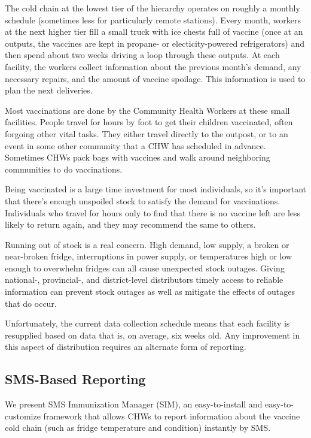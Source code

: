 \documentclass{acm_proc_article-sp}
\begin{document}
The cold chain at the lowest tier of the hierarchy operates on roughly a monthly schedule (sometimes less for particularly remote stations). Every month, workers at the next higher tier fill a small truck with ice chests full of vaccine (once at an outputs, the vaccines are kept in propane- or electicity-powered refrigerators) and then spend about two weeks driving a loop through these outputs. At each facility, the workers collect information about the previous month's demand, any necessary repairs, and the amount of vaccine spoilage. This information is used to plan the next deliveries. 

Most vaccinations are done by the Community Health Workers at these small facilities. People travel for hours by foot to get their children vaccinated, often forgoing other vital tasks. They either travel directly to the outpost, or to an event in some other community that a CHW has scheduled in advance. Sometimes CHWs pack bags with vaccines and walk around neighboring communities to do vaccinations. 

Being vaccinated is a large time investment for most individuals, so it's important that there's enough unspoiled stock to satisfy the demand for vaccinations. Individuals who travel for hours only to find that there is no vaccine left are less likely to return again, and they may recommend the same to others. 

Running out of stock is a real concern. High demand, low supply, a broken or near-broken fridge, interruptions in power supply, or temperatures high or low enough to overwhelm fridges can all cause unexpected stock outages. Giving national-, provincial-, and district-level distributors timely access to reliable information can prevent stock outages as well as mitigate the effects of outages that do occur. 

Unfortunately, the current data collection schedule means that each facility is resupplied based on data that is, on average, six weeks old. Any improvement in this aspect of distribution requires an alternate form of reporting. 

\subsection{SMS-Based Reporting}

We present SMS Immunization Manager (SIM), an easy-to-install and easy-to-customize framework that allows CHWs to report information about the vaccine cold chain (such as fridge temperature and condition) instantly by SMS. 
\end{document}
